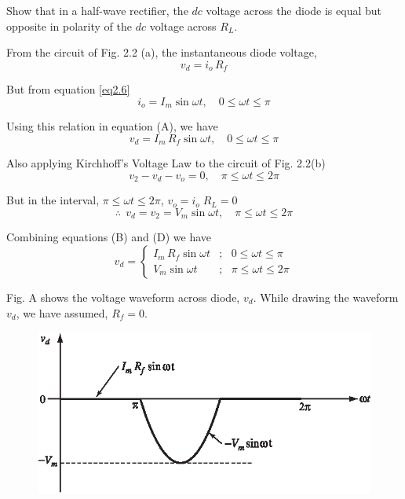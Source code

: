 \begin{example}\label{exam2.1}
Show that in a half-wave rectifier, the $dc$ voltage across the diode
is equal but opposite in polarity of the $dc$ voltage across $R_L$.
\end{example}

\begin{solution}
From the circuit of Fig. 2.2 (a), the instantaneous diode voltage,
\begin{equation*}
v_d = i_o\, R_f \tag{A}
\end{equation*}

But from equation \eqref{eq2.6}
$$
i_o = I_m \sin \omega t, \quad 0 \leq \omega t \leq \pi
$$

Using this relation in equation (A), we have 
\begin{equation*}
v_d = I_m\, R_f \sin \omega t, \quad 0 \leq \omega t \leq \pi \tag{B}
\end{equation*}

Also applying Kirchhoff's Voltage Law to the circuit of Fig. 2.2(b)
\begin{equation*}
v_2 - v_d - v_o = 0, \quad \pi \leq \omega t \leq 2 \pi \tag{C}
\end{equation*}

But in the interval, $\pi \leq \omega t \leq 2 \pi$, \quad $v_o = i_o\;
R_L = 0$
\begin{equation*}
\therefore~~ v_d = v_2 = V_m \sin \omega t, \quad \pi \leq \omega t
\leq 2 \pi \tag{D}
\end{equation*}

Combining equations (B) and (D) we have
$$
v_d = \begin{cases}
I_m\, R_f \sin \omega t  &;~~~ 0 \leq \omega t \leq \pi\\
V_m \sin \omega t  &;~~~ \pi \leq \omega t \leq 2 \pi
\end{cases}
$$ 

Fig. A shows the voltage waveform across diode, $v_d$. While drawing
the waveform $v_d$, we have assumed, $R_f = 0$.
\begin{figure}[H]
\centering
\includegraphics{chap2/add-fig/S3-EE-02-003.eps}


\end{figure}
\end{solution}
